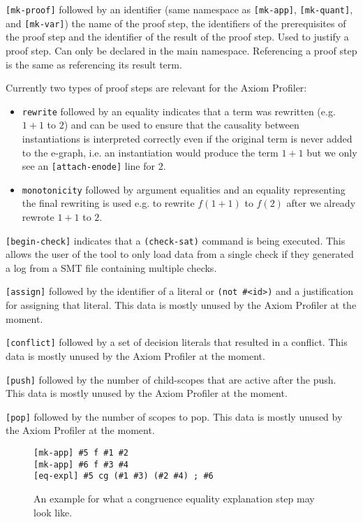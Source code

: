 \documentclass[orivec]{llncs}
\begin{document}
\texttt{[mk-proof]} followed by an identifier (same namespace as \texttt{[mk-app]}, \texttt{[mk-quant]}, and \texttt{[mk-var]}) the name of the proof step, the identifiers of the prerequisites of the proof step and the identifier of the result of the proof step. Used to justify a proof step. Can only be declared in the main namespace. Referencing a proof step is the same as referencing its result term.

Currently two types of proof steps are relevant for the Axiom Profiler:

\begin{itemize}
\item \texttt{rewrite} followed by an equality indicates that a term was rewritten (e.g. $ 1 + 1 $ to $ 2 $) and can be used to ensure that the causality between instantiations is interpreted correctly even if the original term is never added to the e-graph, i.e. an instantiation would produce the term $ 1 + 1 $ but we only see an \texttt{[attach-enode]} line for $ 2 $.
\item \texttt{monotonicity} followed by argument equalities and an equality representing the final rewriting is used e.g. to rewrite $ f(1 + 1) $ to $ f(2) $ after we already rewrote $ 1 + 1 $ to $ 2 $.
\end{itemize}

\texttt{[begin-check]} indicates that a \texttt{(check-sat)} command is being executed. This allows the user of the tool to only load data from a single check if they generated a log from a SMT file containing multiple checks.

\texttt{[assign]} followed by the identifier of a literal or \texttt{(not \#<id>)} and a justification for assigning that literal. This data is mostly unused by the Axiom Profiler at the moment.

\texttt{[conflict]} followed by a set of decision literals that resulted in a conflict. This data is mostly unused by the Axiom Profiler at the moment.

\texttt{[push]} followed by the number of child-scopes that are active after the push. This data is mostly unused by the Axiom Profiler at the moment.

\texttt{[pop]} followed by the number of scopes to pop. This data is mostly unused by the Axiom Profiler at the moment.

\begin{figure}[t]
\begin{lstlisting}
[mk-app] #5 f #1 #2
[mk-app] #6 f #3 #4
[eq-expl] #5 cg (#1 #3) (#2 #4) ; #6
\end{lstlisting}
\caption{An example for what a congruence equality explanation step may look like.}
\label{fig:congruence_step_log}
\end{figure}
\end{document}
